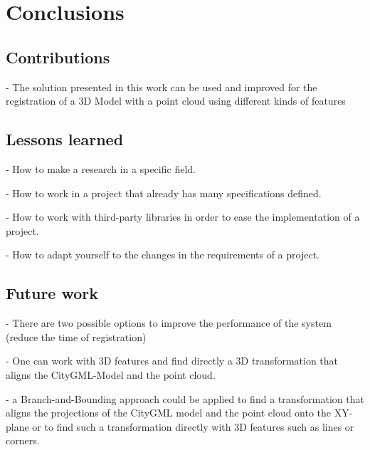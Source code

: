 

    \chapter{Conclusions}

    \section{Contributions}
    - The solution presented in this work can be used and improved for the registration of a 3D Model with a point cloud using different kinds of features 

    \section{Lessons learned}
    - How to make a research in a specific field. \par
    - How to work in a project that already has many specifications defined. \par
    - How to work with third-party libraries in order to ease the implementation of a project. \par
    - How to adapt yourself to the changes in the requirements of a project. \par
    

    \section{Future work}
    - There are two possible options to improve the performance of the system (reduce the time of registration) \par
    - One can work with 3D features and find directly a 3D transformation that aligns the CityGML-Model and the point cloud. \par
    - a Branch-and-Bounding \cite{Bazin_2013_abranchandbound,Breuel_2003_implementation,Brown_2015_globally,Brown_2019_afamily} approach could be applied 
    to find a transformation that aligns the projections of the CityGML model and the point cloud onto the XY-plane or to find such a transformation directly
    with 3D features such as lines or corners. \par

